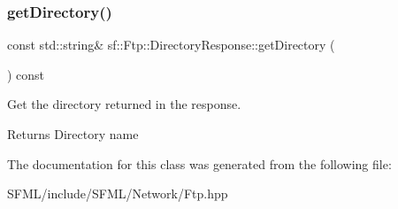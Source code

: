 \subsubsection{\texorpdfstring{getDirectory()}{getDirectory()}}
{\footnotesize\ttfamily const std\+::string\& sf\+::\+Ftp\+::\+Directory\+Response\+::get\+Directory (\begin{DoxyParamCaption}{ }\end{DoxyParamCaption}) const}



Get the directory returned in the response. 

\begin{DoxyReturn}{Returns}
Directory name \begin{DoxyVerb}\end{DoxyVerb}
 
\end{DoxyReturn}


The documentation for this class was generated from the following file\+:\begin{DoxyCompactItemize}
\item 
S\+F\+M\+L/include/\+S\+F\+M\+L/\+Network/Ftp.\+hpp\end{DoxyCompactItemize}
